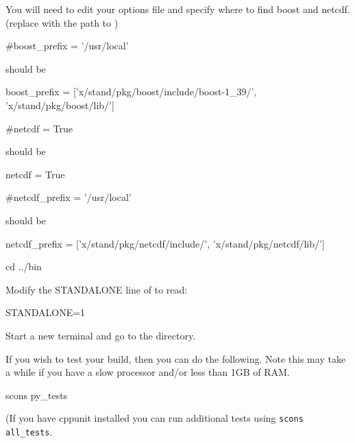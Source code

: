 You will need to edit your options file and specify where to find boost and netcdf.
(replace  with the path to )

\begin{python}
#boost_prefix = '/usr/local'
\end{python}

should be
\begin{python}
boost_prefix = ['x/stand/pkg/boost/include/boost-1_39/', 'x/stand/pkg/boost/lib/']
\end{python}

\begin{python}
#netcdf = True
\end{python}

should be
\begin{python}
netcdf = True
\end{python}

\begin{python}
#netcdf_prefix = '/usr/local'
\end{python}

should be \begin{python}
netcdf_prefix = ['x/stand/pkg/netcdf/include/', 
			'x/stand/pkg/netcdf/lib/']
\end{python}

% 

\begin{shellCode}
cd ../bin
\end{shellCode}

Modify the STANDALONE line of  to read:
 
STANDALONE=1

Start a new terminal and go to the  directory.


If you wish to test your build, then you can do the following. 
Note this may take a while if you have a slow processor and/or less than 1GB of RAM.
\begin{shellCode}
scons py_tests
\end{shellCode}
(If you have cppunit installed you can run additional tests using \texttt{scons all_tests}.

